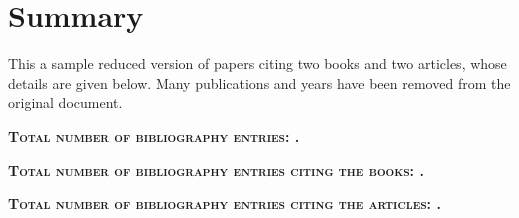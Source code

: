 \section*{Summary}

This a sample reduced version of papers citing two books and two articles, whose details are given below. 
Many publications and years have been removed from the original document.

\textsc{\textbf{Total number of bibliography entries: .}}

\textsc{\textbf{Total number of bibliography entries citing the books: .}}

\textsc{\textbf{Total number of bibliography entries citing the articles: .}}